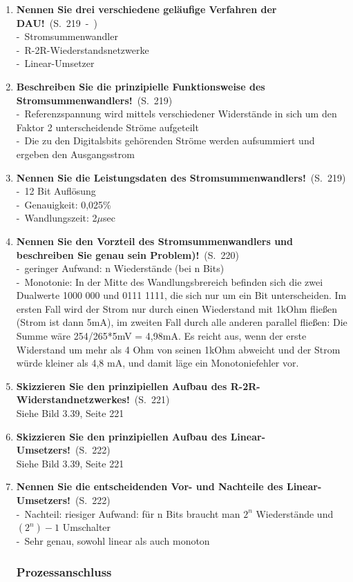 \documentclass[a4paper,12pt]{article}
\newcommand{\statement}[3]{\pagebreak[3]\item {\textbf{#1!}}\ (S.\ #2)#3}
\newcommand{\catchword}[1]{\\-\ #1}
\newcommand{\normaltext}[1]{\\#1}
\newcommand{\page}[1]{#1}
\newcommand{\pages}[2]{#1\ -\ #2}
\begin{document}
\begin{enumerate}
  \statement{Nennen Sie drei verschiedene geläufige Verfahren der DAU}{\pages{219}{}}
  {
    \catchword{Stromsummenwandler}
    \catchword{R-2R-Wiederstandsnetzwerke}
    \catchword{Linear-Umsetzer}
  }

  \statement{Beschreiben Sie die prinzipielle Funktionsweise des Stromsummenwandlers}{\page{219}}
  {
    \catchword{Referenzspannung wird mittels verschiedener Widerstände in sich um den Faktor 2
               unterscheidende Ströme aufgeteilt}
    \catchword{Die zu den Digitalsbits gehörenden Ströme werden aufsummiert und ergeben den Ausgangsstrom}
  }

  \statement{Nennen Sie die Leistungsdaten des Stromsummenwandlers}{\page{219}}
  {
    \catchword{12 Bit Auflösung}
    \catchword{Genauigkeit: 0,025\%}
    \catchword{Wandlungszeit: 2$\mu$sec}
  }

  \statement{Nennen Sie den Vorzteil des Stromsummenwandlers und beschreiben Sie
             genau sein Problem)}{\page{220}}
  {
    \catchword{geringer Aufwand: n Wiederstände (bei n Bits)}
    \catchword{Monotonie: In der Mitte des Wandlungsbrereich befinden sich die zwei Dualwerte 1000 000
               und 0111 1111, die sich nur um ein Bit unterscheiden. Im ersten Fall wird der Strom nur
               durch einen Wiederstand mit 1kOhm fließen (Strom ist dann 5mA), im zweiten Fall durch alle
               anderen parallel fließen: Die Summe wäre 254/265*5mV = 4,98mA. Es reicht aus, wenn der erste
               Widerstand um mehr als 4 Ohm von seinen 1kOhm abweicht und der Strom würde kleiner als 4,8 mA,
               und damit läge ein Monotoniefehler vor.}
  }

  \statement{Skizzieren Sie den prinzipiellen Aufbau des R-2R-Widerstandnetzwerkes}{\page{221}}
  {
    \normaltext{Siehe Bild 3.39, Seite 221}
  }

  \statement{Skizzieren Sie den prinzipiellen Aufbau des Linear-Umsetzers}{\page{222}}
  {
    \normaltext{Siehe Bild 3.39, Seite 221}
  }

  \statement{Nennen Sie die entscheidenden Vor- und Nachteile des Linear-Umsetzers}{\page{222}}
  {
    \catchword{Nachteil: riesiger Aufwand: für n Bits braucht man $2^n$ Wiederstände und $(2^n)-1$ Umschalter}
    \catchword{Sehr genau, sowohl linear als auch monoton}
  }

  \subsubsection{Prozessanschluss}


\end{enumerate}
\end{document}
